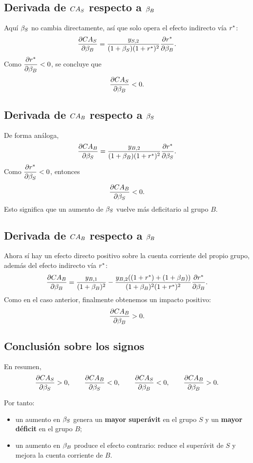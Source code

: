 \subsection*{Derivada de $CA_S$ respecto a $\beta_B$}
Aquí $\beta_S$ no cambia directamente, así que solo opera el efecto indirecto vía $r^*$:
\begin{equation}
\frac{\partial CA_S}{\partial \beta_B}
=
\frac{y_{S,2}}{(1+\beta_S)(1+r^*)^2}\frac{\partial r^*}{\partial \beta_B}.
\label{eq:dcasdbetab}
\end{equation}
Como $\dfrac{\partial r^*}{\partial \beta_B}<0$, se concluye que
\[
\frac{\partial CA_S}{\partial \beta_B}<0.
\]

\subsection*{Derivada de $CA_B$ respecto a $\beta_S$}
De forma análoga,
\begin{equation}
\frac{\partial CA_B}{\partial \beta_S}
=
\frac{y_{B,2}}{(1+\beta_B)(1+r^*)^2}\frac{\partial r^*}{\partial \beta_S}.
\label{eq:dcabdbetas}
\end{equation}
Como $\dfrac{\partial r^*}{\partial \beta_S}<0$, entonces
\[
\frac{\partial CA_B}{\partial \beta_S}<0.
\]
Esto significa que un aumento de $\beta_S$ vuelve más deficitario al grupo $B$.

\subsection*{Derivada de $CA_B$ respecto a $\beta_B$}
Ahora sí hay un efecto directo positivo sobre la cuenta corriente del propio grupo, además del efecto indirecto vía $r^*$:
\begin{equation}
\frac{\partial CA_B}{\partial \beta_B}
=
\frac{y_{B,1}}{(1+\beta_B)^2}
-
\frac{y_{B,2}((1+r^*)+(1+\beta_B))}{(1+\beta_B)^2(1+r^*)^2}\frac{\partial r^*}{\partial \beta_B}.
\label{eq:dcabdbetab}
\end{equation}
Como en el caso anterior, finalmente obtenemos un impacto positivo:
\[
\frac{\partial CA_B}{\partial \beta_B}>0.
\]

\subsection*{Conclusión sobre los signos}
En resumen,
\[
\frac{\partial CA_S}{\partial \beta_S} > 0,
\qquad
\frac{\partial CA_B}{\partial \beta_S} < 0,
\qquad
\frac{\partial CA_S}{\partial \beta_B} < 0,
\qquad
\frac{\partial CA_B}{\partial \beta_B} > 0.
\]

Por tanto:
\begin{itemize}[leftmargin=1.2cm]
    \item un aumento en $\beta_S$ genera un \textbf{mayor superávit} en el grupo $S$ y un \textbf{mayor déficit} en el grupo $B$;
    \item un aumento en $\beta_B$ produce el efecto contrario: reduce el superávit de $S$ y mejora la cuenta corriente de $B$.
\end{itemize}

